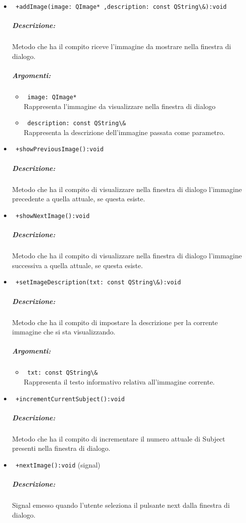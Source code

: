 \begin{itemize}
\item \color{blue}\verb! +addImage(image: QImage* ,description: const QString\&):void!
\color{black}
\subparagraph{Descrizione:}
 Metodo che ha il compito riceve l'immagine da mostrare nella finestra di dialogo.
\subparagraph{Argomenti:}
\begin{itemize}
\item \color{RoyalPurple} \verb! image: QImage* ! \\ Rappresenta l'immagine da visualizzare nella finestra di dialogo
\item \color{RoyalPurple} \verb! description: const QString\& ! \\ Rappresenta la descrizione dell'immagine passata come parametro.
\end{itemize}

\item \color{blue}\verb! +showPreviousImage():void!
\color{black}
\subparagraph{Descrizione:}
 Metodo che ha il compito di visualizzare nella finestra di dialogo l'immagine precedente a quella attuale, se questa esiste.

\item \color{blue}\verb! +showNextImage():void!
\color{black}
\subparagraph{Descrizione:}
 Metodo che ha il compito di visualizzare nella finestra di dialogo l'immagine successiva a quella attuale, se questa esiste.

\item \color{blue}\verb! +setImageDescription(txt: const QString\&):void!
\color{black}
\subparagraph{Descrizione:}
 Metodo che ha il compito di impostare la descrizione per la corrente immagine che si sta visualizzando.
\subparagraph{Argomenti:}
\begin{itemize}
\item \color{RoyalPurple} \verb! txt: const QString\& ! \\ Rappresenta il testo informativo relativa all'immagine corrente.
\end{itemize}

\item \color{blue}\verb! +incrementCurrentSubject():void!
\color{black}
\subparagraph{Descrizione:}
 Metodo che ha il compito di incrementare il numero attuale di Subject\g{} presenti nella finestra di dialogo.
 
\item \color{blue}\verb! +nextImage():void! (signal)
\color{black}
\subparagraph{Descrizione:} Signal\g{} emesso quando l'utente seleziona il pulsante next dalla finestra di dialogo.


\end{itemize}
